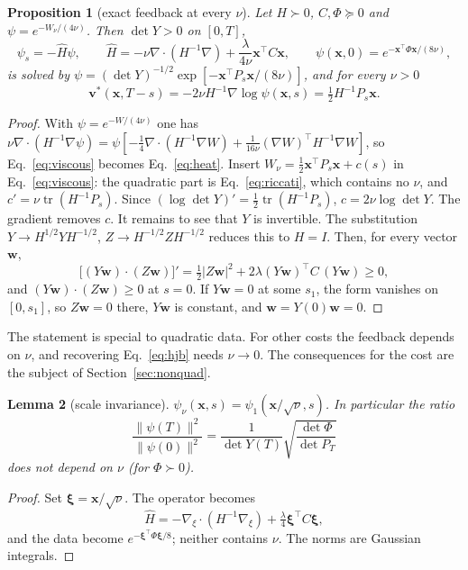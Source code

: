 \documentclass[11pt,a4paper]{article}
\newtheorem{proposition}{Proposition}
\newtheorem{lemma}[proposition]{Lemma}
\theoremstyle{remark}
\newcommand{\x}{\mathbf x}
\newcommand{\vv}{\mathbf v}
\begin{document}
\begin{proposition}[exact feedback at every $\nu$]
\label{prop:feedback}
Let $H\succ0$, $C,\Phi\succeq0$ and $\psi=e^{-W_\nu/(4\nu)}$. Then $\det Y>0$ on
$[0,T]$,
\begin{equation}
 \psi_s=-\hat H\psi,\qquad
 \hat H=-\nu\nabla\!\cdot(H^{-1}\nabla)+\frac{\lambda}{4\nu}\x^\top C\x,\qquad
 \psi(\x,0)=e^{-\x^\top\Phi\x/(8\nu)},
 \label{eq:heat}
\end{equation}
is solved by
$\psi=(\det Y)^{-1/2}\exp[-\x^\top P_s\x/(8\nu)]$, and for every $\nu>0$
\begin{equation}
 \vv^*(\x,T-s)=-2\nu H^{-1}\nabla\log\psi(\x,s)=\tfrac12H^{-1}P_s\x .
 \label{eq:recover}
\end{equation}
\end{proposition}
\begin{proof}
With $\psi=e^{-W/(4\nu)}$ one has
$\nu\nabla\!\cdot(H^{-1}\nabla\psi)=\psi[-\tfrac14\nabla\!\cdot(H^{-1}\nabla W)
+\tfrac1{16\nu}(\nabla W)^\top H^{-1}\nabla W]$, so
Eq.~\eqref{eq:viscous} becomes Eq.~\eqref{eq:heat}. Insert
$W_\nu=\tfrac12\x^\top P_s\x+c(s)$ in Eq.~\eqref{eq:viscous}: the quadratic
part is Eq.~\eqref{eq:riccati}, which contains no $\nu$, and
$c'=\nu\operatorname{tr}(H^{-1}P_s)$. Since
$(\log\det Y)'=\tfrac12\operatorname{tr}(H^{-1}P_s)$,
$c=2\nu\log\det Y$. The gradient removes $c$. It remains to see that $Y$ is
invertible. The substitution $Y\to H^{1/2}YH^{-1/2}$, $Z\to H^{-1/2}ZH^{-1/2}$
reduces this to $H=I$. Then, for every vector $\mathbf w$,
\begin{equation}
 \bigl[(Y\mathbf w)\cdot(Z\mathbf w)\bigr]'=\tfrac12|Z\mathbf w|^2
 +2\lambda(Y\mathbf w)^\top C\,(Y\mathbf w)\ge0 ,
 \label{eq:form}
\end{equation}
and $(Y\mathbf w)\cdot(Z\mathbf w)\ge0$ at $s=0$. If $Y\mathbf w=0$ at some $s_1$, the form vanishes on
$[0,s_1]$, so $Z\mathbf w=0$ there, $Y\mathbf w$ is constant, and
$\mathbf w=Y(0)\mathbf w=0$.
\end{proof}

The statement is special to quadratic data. For other costs the feedback
depends on $\nu$, and recovering Eq.~\eqref{eq:hjb} needs $\nu\to0$. The
consequences for the cost are the subject of Section~\ref{sec:nonquad}.

\begin{lemma}[scale invariance]
\label{lem:scale}
$\psi_\nu(\x,s)=\psi_1(\x/\sqrt\nu,s)$. In particular the ratio
\[
 \frac{\|\psi(T)\|^2}{\|\psi(0)\|^2}=\frac{1}{\det Y(T)}\sqrt{\frac{\det\Phi}{\det P_T}}
\]
does not depend on $\nu$ (for $\Phi\succ0$).
\end{lemma}
\begin{proof}
Set $\boldsymbol\xi=\x/\sqrt\nu$. The operator becomes
\[
 \hat H=-\nabla_\xi\!\cdot(H^{-1}\nabla_\xi)+\tfrac\lambda4\boldsymbol\xi^\top C\boldsymbol\xi,
\]
and the data become $e^{-\boldsymbol\xi^\top\Phi\boldsymbol\xi/8}$; neither
contains $\nu$. The norms are Gaussian integrals.
\end{proof}
\end{document}
